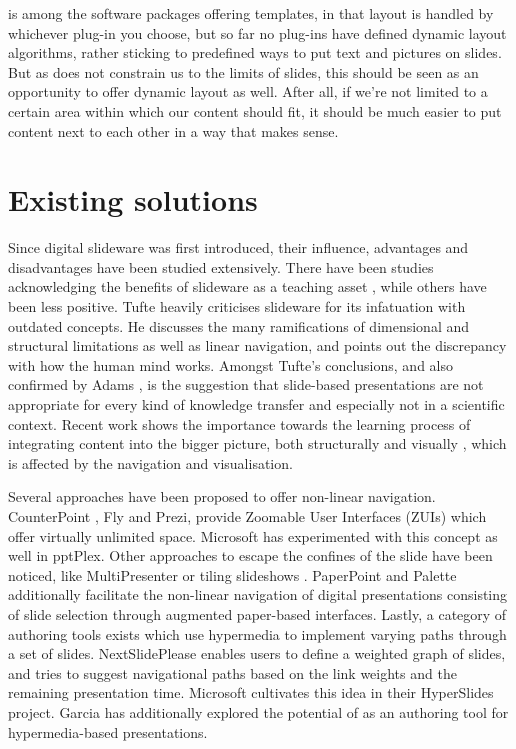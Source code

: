    \mxp is among the software packages offering templates, in that layout is
   handled by whichever plug-in you choose, but so far no plug-ins have defined
   dynamic layout algorithms, rather sticking to predefined ways to put text
   and pictures on slides. But as \mxp does not constrain us to the limits of
   slides, this should be seen as an opportunity to offer dynamic layout as
   well. After all, if we're not limited to a certain area within which our
   content should fit, it should be much easier to put content next to each
   other in a way that makes sense.

  \section{Existing solutions}

   Since digital slideware was first introduced, their influence, advantages
   and disadvantages have been studied extensively. There have been studies
   acknowledging the benefits of slideware as a teaching asset
   \citep{holzinger-1}, while others have been less positive. Tufte
   \citeyearpar{tufte-1} heavily criticises slideware for its infatuation with
   outdated concepts. He discusses the many ramifications of dimensional and
   structural limitations as well as linear navigation, and points out the
   discrepancy with how the human mind works. Amongst Tufte's conclusions, and
   also confirmed by Adams \citep{adams-1}, is the suggestion that slide-based
   presentations are not appropriate for every kind of knowledge transfer and
   especially not in a scientific context. Recent work shows the importance
   towards the learning process of integrating content into the bigger picture,
   both structurally and visually \citep{gross-1}, which is affected by the
   navigation and visualisation.

   Several approaches have been proposed to offer non-linear navigation.
   CounterPoint \citep{good-1}, Fly \citep{lichtschlag-1} and Prezi, provide
   Zoomable User Interfaces (ZUIs) which offer virtually unlimited space.
   Microsoft has experimented with this concept as well in pptPlex. Other
   approaches to escape the confines of the slide have been noticed, like
   MultiPresenter \citep{lanir-1} or tiling slideshows \citep{chen-1}.
   PaperPoint \citep{signer-1} and Palette \citep{nelson-2} additionally
   facilitate the non-linear navigation of digital presentations consisting of
   slide selection through augmented paper-based interfaces. Lastly, a category
   of authoring tools exists which use hypermedia to implement varying paths
   through a set of slides. NextSlidePlease \citep{spicer-1} enables users to
   define a weighted graph of slides, and tries to suggest navigational paths
   based on the link weights and the remaining presentation time. Microsoft
   cultivates this idea in their HyperSlides \citep{edge-1} project. Garcia
   \citep{garcia-1} has additionally explored the potential of \ppt* as an
   authoring tool for hypermedia-based presentations.

